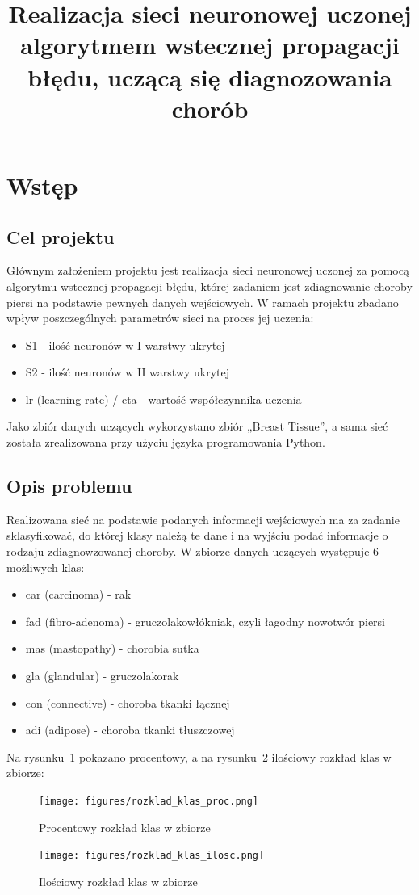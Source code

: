 \documentclass[12pt,twoside]{article}
\author{}
\title{Realizacja sieci neuronowej uczonej algorytmem wstecznej propagacji błędu, uczącą się diagnozowania chorób}
\begin{document}
\maketitle

\blankpage

\tableofcontents

\clearpage
\blankpage

\section{Wstęp}
\subsection{Cel projektu}

Głównym założeniem projektu jest realizacja sieci neuronowej uczonej za pomocą algorytmu wstecznej propagacji błędu, której zadaniem jest zdiagnowanie choroby piersi na podstawie pewnych danych wejściowych.
W ramach projektu zbadano wpływ poszczególnych parametrów sieci na proces jej uczenia:
\begin{itemize}
	\item S1 - ilość neuronów w I warstwy ukrytej
	\item S2 - ilość neuronów w II warstwy ukrytej
	\item lr (learning rate) / eta - wartość współczynnika uczenia
\end{itemize}
Jako zbiór danych uczących wykorzystano zbiór „Breast Tissue”, a sama sieć została zrealizowana przy użyciu języka programowania Python.
\newpage
\subsection{Opis problemu}
Realizowana sieć na podstawie podanych informacji wejściowych ma za zadanie sklasyfikować, do której klasy należą te dane i na wyjściu podać informacje o rodzaju zdiagnowzowanej choroby.
W zbiorze danych uczących występuje 6 możliwych klas:
\begin{itemize}
	\item car (carcinoma) - rak
	\item fad (fibro-adenoma) - gruczolakowłókniak, czyli łagodny nowotwór piersi
	\item mas (mastopathy) - chorobia sutka
	\item gla (glandular) - gruczolakorak
	\item con (connective) - choroba tkanki łącznej
	\item adi (adipose) - choroba tkanki tłuszczowej
\end{itemize}
Na rysunku~\ref{Fig:rozklad_klas_proc} pokazano procentowy, a na rysunku~\ref{Fig:rozklad_klas_ilosc} ilościowy rozkład klas w zbiorze:
\begin{figure}[ht!]
	\centering
	\texttt{[image: figures/rozklad\_klas\_proc.png]}
	\caption{Procentowy rozkład klas w zbiorze}
	\label{Fig:rozklad_klas_proc}
\end{figure}
\begin{figure}[ht!]
	\centering
	\texttt{[image: figures/rozklad\_klas\_ilosc.png]}
	\caption{Ilościowy rozkład klas w zbiorze}
	\label{Fig:rozklad_klas_ilosc}
\end{figure}
\newpage
\end{document}
